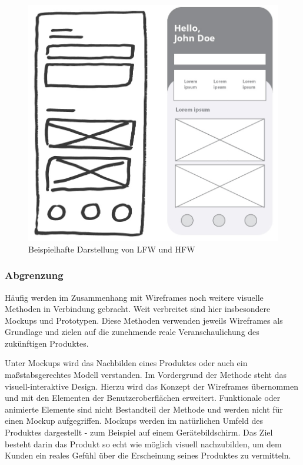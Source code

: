 \begin{figure}
    \centering
    \includegraphics[scale=1]{figures/jan/Wire_Fixes-LFWvsHFW2.png}
    \caption[Beispielhafte Darstellung von LFW und HFW]{Beispielhafte Darstellung von LFW und HFW}
    \label{fig:image}
\end{figure}

\subsubsection{Abgrenzung}

Häufig werden im Zusammenhang mit Wireframes noch weitere visuelle Methoden in Verbindung gebracht. Weit verbreitet sind hier insbesondere Mockups und Prototypen. Diese Methoden verwenden jeweils Wireframes als Grundlage und zielen auf die zunehmende reale Veranschaulichung des zukünftigen Produktes.

Unter Mockups wird das Nachbilden eines Produktes oder auch ein maßstabsgerechtes Modell verstanden. Im Vordergrund der Methode steht das visuell-interaktive Design. Hierzu wird das Konzept der Wireframes übernommen und mit den Elementen der Benutzeroberflächen erweitert. Funktionale oder animierte Elemente sind nicht Bestandteil der Methode und werden nicht für einen Mockup aufgegriffen. Mockups werden im natürlichen Umfeld des Produktes dargestellt - zum Beispiel auf einem Gerätebildschirm. Das Ziel besteht darin das Produkt so echt wie möglich visuell nachzubilden, um dem Kunden ein reales Gefühl über die Erscheinung seines Produktes zu vermitteln.

